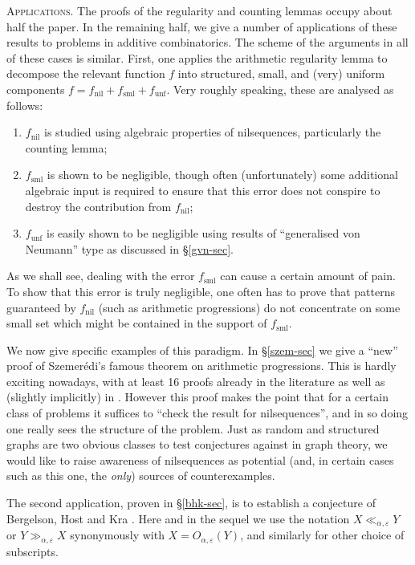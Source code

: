 \documentclass[11pt,reqno]{amsart}
\numberwithin{equation}{section}
\theoremstyle{plain}
\theoremstyle{definition}
\newcommand\1{{\bf 1}}
\newcommand\2{{\bf 2}}
\newcommand\eps{\varepsilon}
\newcommand\nil{{\operatorname{nil}}}
\newcommand\sml{{\operatorname{sml}}}
\newcommand\unf{{\operatorname{unf}}}
\begin{document}
\textsc{Applications.} The proofs of the regularity and counting lemmas occupy about half the paper. In the remaining half, we give a number of applications of these results to problems in additive combinatorics.  The scheme of the arguments in all of these cases is similar.  First, one applies the arithmetic regularity lemma to decompose the relevant function $f$ into structured, small, and (very) uniform components $f = f_\nil + f_\sml + f_\unf$. Very roughly speaking, these are analysed as follows:

\begin{enumerate}
\item $f_\nil$ is studied using algebraic properties of nilsequences, particularly the counting lemma;
\item $f_\sml$ is shown to be negligible, though often (unfortunately) some additional algebraic input is required to ensure that this error does not conspire to destroy the contribution from $f_\nil$;
\item $f_\unf$ is easily shown to be negligible using results of ``generalised von Neumann'' type as discussed in \S \ref{gvn-sec}.
\end{enumerate}

As we shall see, dealing with the error $f_\sml$ can cause a certain amount of pain. To show that this error is truly negligible, one often has to prove that patterns guaranteed by $f_\nil$ (such as arithmetic progressions) do not concentrate on some small set which might be contained in the support of $f_\sml$.

We now give specific examples of this paradigm.  In \S \ref{szem-sec} we give a ``new'' proof of Szemer\'edi's famous theorem on arithmetic progressions. This is hardly exciting nowadays, with at least 16 proofs already in the literature \cite{austin-multdimsz, austin-dhj,leib2,furstenberg-book,fko, gowers-longaps,gowers-hypergraph,nagle-rodl-schacht,polymath,szemeredi-aps,tao-quant-ergodic,tao-hypergraph,towsner} as well as (slightly implicitly) in \cite{bergelson-host-kra,host-kra,ziegler}. However this proof makes the point that for a certain class of problems it suffices to ``check the result for nilsequences'', and in so doing one really sees the structure of the problem. Just as random and structured graphs are two obvious classes to test conjectures against in graph theory, we would like to raise awareness of nilsequences as potential (and, in certain cases such as this one, the \emph{only}) sources of counterexamples.

The second application, proven in \S \ref{bhk-sec}, is to establish a conjecture of Bergelson, Host and Kra \cite{bergelson-host-kra}. Here and in the sequel we use the notation $X \ll_{\alpha,\eps} Y$ or $Y \gg_{\alpha,\eps} X$ synonymously with $X = O_{\alpha,\eps}(Y)$, and similarly for other choice of subscripts.
\end{document}
